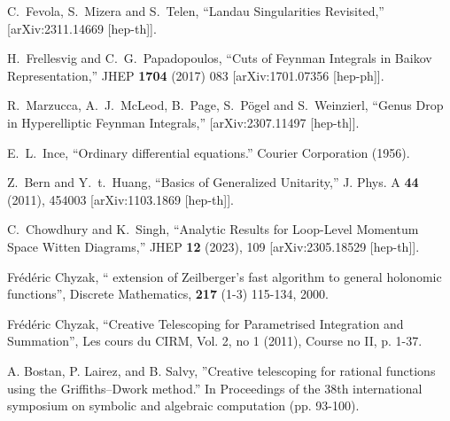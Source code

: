 \documentclass[a4paper,12pt]{article}
\numberwithin{equation}{section}
\numberwithin{figure}{section}
\begin{document}
\begin{thebibliography}{99}
C.~Fevola, S.~Mizera and S.~Telen,
``Landau Singularities Revisited,''
[arXiv:2311.14669 [hep-th]].



  H.~Frellesvig and C.~G.~Papadopoulos,
  ``Cuts of Feynman Integrals in Baikov Representation,''
  JHEP {\bf 1704} (2017) 083
  [arXiv:1701.07356 [hep-ph]].
  
R.~Marzucca, A.~J.~McLeod, B.~Page, S.~P\"ogel and S.~Weinzierl,
``Genus Drop in Hyperelliptic Feynman Integrals,''
[arXiv:2307.11497 [hep-th]].

 E.~L.~Ince, ``Ordinary differential equations.''
  Courier Corporation  (1956).
 

  
Z.~Bern and Y.~t.~Huang,
``Basics of Generalized Unitarity,''
J. Phys. A \textbf{44} (2011), 454003
[arXiv:1103.1869 [hep-th]].



C.~Chowdhury and K.~Singh,
``Analytic Results for Loop-Level Momentum Space Witten Diagrams,''
JHEP \textbf{12} (2023), 109
[arXiv:2305.18529 [hep-th]].

  Fr\'ed\'eric Chyzak, `` extension of
    Zeilberger's fast algorithm to general holonomic functions'',
Discrete Mathematics, {\bf 217} (1-3) 115-134, 2000.

 Fr\'ed\'eric Chyzak, ``Creative Telescoping for
  Parametrised Integration and Summation'',  Les cours du CIRM,  Vol. 2, no 1 (2011), Course no II, p. 1-37.

 A. Bostan, P. Lairez, and B. Salvy,
  ''Creative telescoping for rational functions using the
  Griffiths--Dwork method.'' In Proceedings of the 38th international
  symposium on symbolic and algebraic computation (pp. 93-100). 

	
	


\end{thebibliography}
\end{document}
